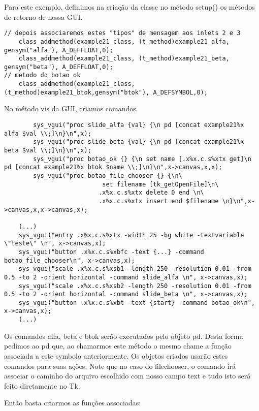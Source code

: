 Para este exemplo, definimos na criação da classe no método setup() os métodos de retorno de nossa GUI.

\begin{lstlisting}
// depois associaremos estes "tipos" de mensagem aos inlets 2 e 3
    class_addmethod(example21_class, (t_method)example21_alfa,  gensym("alfa"), A_DEFFLOAT,0); 
    class_addmethod(example21_class, (t_method)example21_beta,  gensym("beta"), A_DEFFLOAT,0); 
// metodo do botao ok
    class_addmethod(example21_class, (t_method)example21_btok,gensym("btok"), A_DEFSYMBOL,0); 
\end{lstlisting}

No método vis da GUI, criamos comandos.

\begin{lstlisting}
	    sys_vgui("proc slide_alfa {val} {\n pd [concat example21%x alfa $val \\;]\n}\n",x);
	    sys_vgui("proc slide_beta {val} {\n pd [concat example21%x beta $val \\;]\n}\n",x);
	    sys_vgui("proc botao_ok {} {\n set name [.x%x.c.s%xtx get]\n pd [concat example21%x btok $name \\;]\n}\n",x->canvas,x,x);
	    sys_vgui("proc botao_file_chooser {} {\n\
						   set filename [tk_getOpenFile]\n\
						  .x%x.c.s%xtx delete 0 end \n\
						  .x%x.c.s%xtx insert end $filename \n}\n",x->canvas,x,x->canvas,x);

	(...)
	sys_vgui("entry .x%x.c.s%xtx -width 25 -bg white -textvariable \"teste\" \n", x->canvas,x);
	sys_vgui("button .x%x.c.s%xbfc -text {...} -command botao_file_chooser\n", x->canvas,x);
	sys_vgui("scale .x%x.c.s%xsb1 -length 250 -resolution 0.01 -from 0.5 -to 2 -orient horizontal -command slide_alfa \n", x->canvas,x);
	sys_vgui("scale .x%x.c.s%xsb2 -length 250 -resolution 0.01 -from 0.5 -to 2 -orient horizontal -command slide_beta \n", x->canvas,x);
	sys_vgui("button .x%x.c.s%xbt -text {start} -command botao_ok\n", x->canvas,x);
	(...)
\end{lstlisting}

Os comandos alfa, beta e btok serão executados pelo objeto pd. Desta forma pedimos ao pd que, ao chamarmos este método o mesmo chame
a função associada a este symbolo anteriormente. Os objetos criados usarão estes comandos para suas ações.
Note que no caso do filechooser, o comando irá associar o caminho do arquivo escolhido com nosso campo text e tudo isto será feito
diretamente no Tk.

Então basta criarmos as funções associadas:

